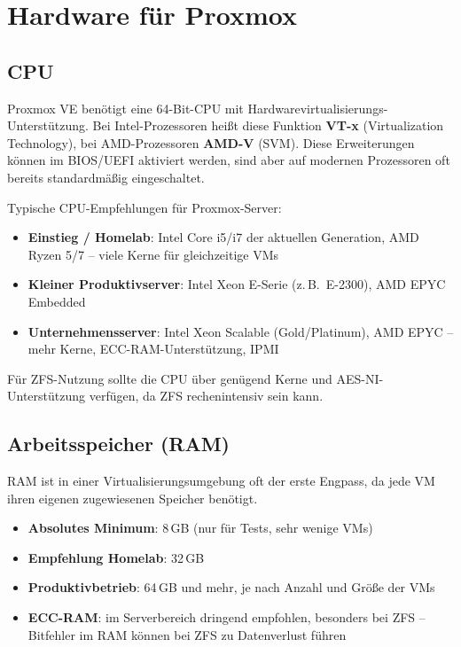 \documentclass[11pt, oneside, numbers=noenddot]{scrbook}
\begin{document}
\chapter{Hardware für Proxmox}

\section{CPU}
Proxmox VE benötigt eine 64-Bit-CPU mit Hardwarevirtualisierungs-Unterstützung. Bei Intel-Prozessoren heißt diese Funktion \textbf{VT-x} (Virtualization Technology), bei AMD-Prozessoren \textbf{AMD-V} (SVM). Diese Erweiterungen können im BIOS/UEFI aktiviert werden, sind aber auf modernen Prozessoren oft bereits standardmäßig eingeschaltet.

Typische CPU-Empfehlungen für Proxmox-Server:
\begin{itemize}
  \item \textbf{Einstieg / Homelab}: Intel Core i5/i7 der aktuellen Generation, AMD Ryzen 5/7 -- viele Kerne für gleichzeitige VMs
  \item \textbf{Kleiner Produktivserver}: Intel Xeon E-Serie (z.\,B.\ E-2300), AMD EPYC Embedded
  \item \textbf{Unternehmensserver}: Intel Xeon Scalable (Gold/Platinum), AMD EPYC -- mehr Kerne, ECC-RAM-Unterstützung, IPMI
\end{itemize}

Für ZFS-Nutzung sollte die CPU über genügend Kerne und AES-NI-Unterstützung verfügen, da ZFS rechenintensiv sein kann.

\section{Arbeitsspeicher (RAM)}
RAM ist in einer Virtualisierungsumgebung oft der erste Engpass, da jede VM ihren eigenen zugewiesenen Speicher benötigt.

\begin{itemize}
  \item \textbf{Absolutes Minimum}: 8\,GB (nur für Tests, sehr wenige VMs)
  \item \textbf{Empfehlung Homelab}: 32\,GB
  \item \textbf{Produktivbetrieb}: 64\,GB und mehr, je nach Anzahl und Größe der VMs
  \item \textbf{ECC-RAM}: im Serverbereich dringend empfohlen, besonders bei ZFS -- Bitfehler im RAM können bei ZFS zu Datenverlust führen
\end{itemize}
\end{document}
